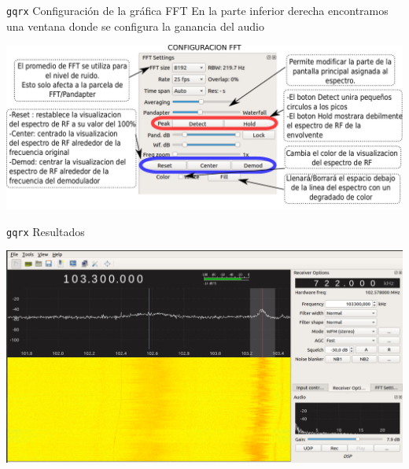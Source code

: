\begin{frame}{{\tt gqrx} Configuración de la gráfica FFT}
En la parte inferior derecha encontramos una ventana donde se configura la ganancia del audio
\begin{center}
\vspace{-0.3cm}
\includegraphics[width=.7\textwidth]{parte2/lab6/pdf/lab6_p_7.pdf}
\end{center}

\end{frame}

\begin{frame}{{\tt gqrx} Resultados}

\begin{center}
\vspace{-0.3cm}
\includegraphics[width=.7\textwidth]{parte2/lab6/pdf/lab6_p_8.pdf}
\end{center}

\end{frame}



